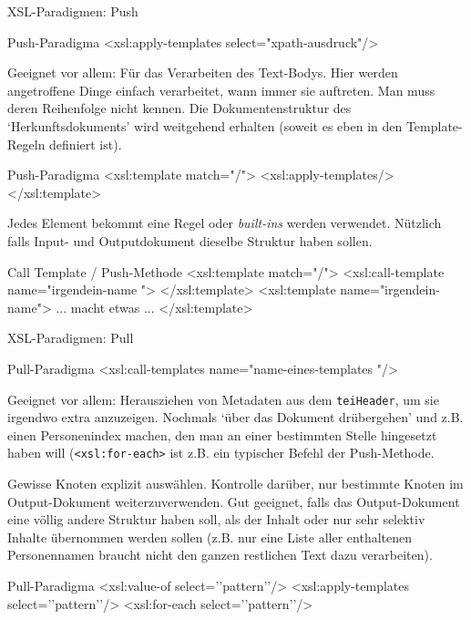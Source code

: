 \begin{frame}{XSL-Paradigmen: Push}
\begin{myxml}{Push-Paradigma}
<xsl:apply-templates select="xpath-ausdruck"/>
\end{myxml}
Geeignet vor allem: Für das Verarbeiten des Text-Bodys. Hier werden angetroffene Dinge einfach verarbeitet, wann immer sie auftreten. Man muss deren Reihenfolge nicht kennen. Die Dokumentenstruktur des `Herkunftsdokuments' wird weitgehend erhalten (soweit es eben in den Template-Regeln definiert ist).

\begin{myxml}{Push-Paradigma}
<xsl:template match="/">
    <xsl:apply-templates/>
</xsl:template>
\end{myxml}

Jedes Element bekommt eine Regel oder \emph{built-ins} werden verwendet. Nützlich falls Input- und Outputdokument dieselbe Struktur haben sollen. 


\begin{myxml}{Call Template / Push-Methode}
<xsl:template match="/">
    <xsl:call-template name="irgendein-name ">
</xsl:template>
<xsl:template name="irgendein-name">
    ... macht etwas ...
</xsl:template>
\end{myxml}

\end{frame}


\begin{frame}{XSL-Paradigmen: Pull}

\begin{myxml}{Pull-Paradigma}
<xsl:call-templates name="name-eines-templates "/>
\end{myxml}
Geeignet vor allem: Herausziehen von Metadaten aus dem \texttt{teiHeader}, um sie irgendwo extra anzuzeigen.
Nochmals `über das Dokument drübergehen' und z.B. einen Personenindex machen, den man an einer bestimmten Stelle hingesetzt haben will (\texttt{<xsl:for-each>} ist z.B. ein typischer Befehl der Push-Methode.

\framebreak

Gewisse Knoten explizit auswählen. Kontrolle darüber, nur bestimmte Knoten im Output-Dokument weiterzuverwenden.
Gut geeignet, falls das Output-Dokument eine völlig andere Struktur haben soll, als der Inhalt oder nur sehr selektiv Inhalte übernommen werden sollen (z.B. nur eine Liste aller enthaltenen Personennamen braucht nicht den ganzen restlichen Text dazu verarbeiten).

\begin{myxml}{Pull-Paradigma}
<xsl:value-of select=’’pattern’’/>
<xsl:apply-templates select=’’pattern’’/>
<xsl:for-each select=’’pattern’’/>
\end{myxml}

\end{frame}

